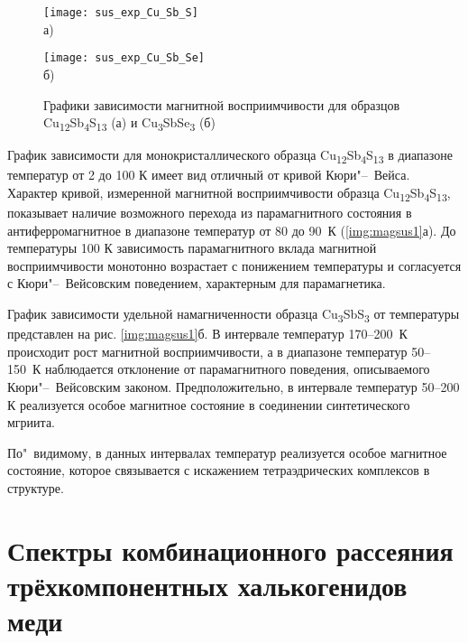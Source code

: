 \begin{figure}[pt!]
  \begin{minipage}[ht]{0.9\linewidth}\centering
    \texttt{[image: sus\_exp\_Cu\_Sb\_S]} \\ а)
  \end{minipage}
\vfill
  \begin{minipage}[ht]{0.9\linewidth}\centering
    \texttt{[image: sus\_exp\_Cu\_Sb\_Se]} \\ б)
  \end{minipage}
      \caption[Графики зависимости магнитной восприимчивости для образцов Cu\textsubscript{12}Sb\textsubscript{4}S\textsubscript{13} (а) и Cu\textsubscript{3}SbSe\textsubscript{3} (б)]{Графики зависимости магнитной восприимчивости для образцов Cu\textsubscript{12}Sb\textsubscript{4}S\textsubscript{13} (а) и Cu\textsubscript{3}SbSe\textsubscript{3} (б)}
    \label{img:magsus2}
\end{figure}

График зависимости для монокристаллического образца Cu\textsubscript{12}Sb\textsubscript{4}S\textsubscript{13} в диапазоне температур от 2 до 100 К имеет вид отличный от кривой Кюри"--~Вейса.
 Характер кривой, измеренной магнитной восприимчивости образца  Cu\textsubscript{12}Sb\textsubscript{4}S\textsubscript{13}, показывает наличие возможного перехода из парамагнитного состояния в антиферромагнитное в диапазоне температур от 80 до 90~К (\ref{img:magsus1}а).
До температуры 100 К зависимость парамагнитного вклада магнитной восприимчивости монотонно возрастает с понижением температуры и согласуется с Кюри"--~Вейсовским поведением, характерным для парамагнетика.

График зависимости удельной намагниченности образца Cu\textsubscript{3}SbS\textsubscript{3} от температуры представлен на рис. \ref{img:magsus1}б.
В интервале температур 170--200~К происходит рост магнитной восприимчивости, а в диапазоне температур 50--150~К наблюдается отклонение от парамагнитного поведения, описываемого Кюри"--~Вейсовским законом.
Предположительно, в интервале температур 50--200 К реализуется особое магнитное состояние в соединении синтетического мгриита.


По"~видимому, в данных интервалах температур реализуется особое магнитное состояние, которое связывается с искажением тетраэдрических комплексов в структуре.

\newpage

\section{Спектры комбинационного рассеяния трёхкомпонентных халькогенидов меди} \label{sect4_2}

